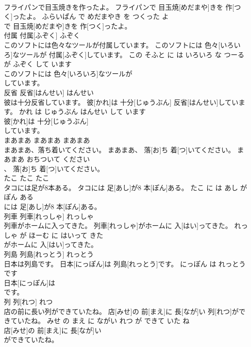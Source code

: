 \documentclass[8pt]{extreport}
\begin{document}
\begin{CJK}{UTF8}{min}
\\	フライパンで目玉焼きを作ったよ。	フライパンで 目玉焼[めだまや]きを 作[つく]ったよ。	ふらいぱん で めだまやき を つくった よ	
\\	で 目玉焼[めだまや]きを 作[つく]ったよ。			
\\	付属	付属[ふぞく]	ふぞく	
\\	このソフトには色々なツールが付属しています。	このソフトには 色々[いろいろ]なツールが 付属[ふぞく]しています。	この そふと に は いろいろ な つーる が ふぞく して います	
\\	このソフトには 色々[いろいろ]なツールが
\\	しています。			
\\	反省	反省[はんせい]	はんせい	
\\	彼は十分反省しています。	彼[かれ]は 十分[じゅうぶん] 反省[はんせい]しています。	かれ は じゅうぶん はんせい して います	
\\	彼[かれ]は 十分[じゅうぶん]
\\	しています。			
\\	まあまあ	まあまあ	まあまあ	
\\	まあまあ、落ち着いてください。	まあまあ、 落[お]ち 着[つ]いてください。	まあまあ おちついて ください	
\\	、 落[お]ち 着[つ]いてください。			
\\	たこ	たこ	たこ	
\\	タコには足が8本ある。	タコには 足[あし]が8 本[ぽん]ある。	たこ に は あし が 
\\	ぽん ある	
\\	には 足[あし]が8 本[ぽん]ある。			
\\	列車	列車[れっしゃ]	れっしゃ	
\\	列車がホームに入ってきた。	列車[れっしゃ]がホームに 入[はい]ってきた。	れっしゃ が ほーむ に はいって きた	
\\	がホームに 入[はい]ってきた。			
\\	列島	列島[れっとう]	れっとう	
\\	日本は列島です。	日本[にっぽん]は 列島[れっとう]です。	にっぽん は れっとう です	
\\	日本[にっぽん]は
\\	です。			
\\	列	列[れつ]	れつ	
\\	店の前に長い列ができていたね。	店[みせ]の 前[まえ]に 長[なが]い 列[れつ]ができていたね。	みせ の まえ に ながい れつ が できて いた ね	
\\	店[みせ]の 前[まえ]に 長[なが]い
\\	ができていたね。			

\end{CJK}
\end{document}
